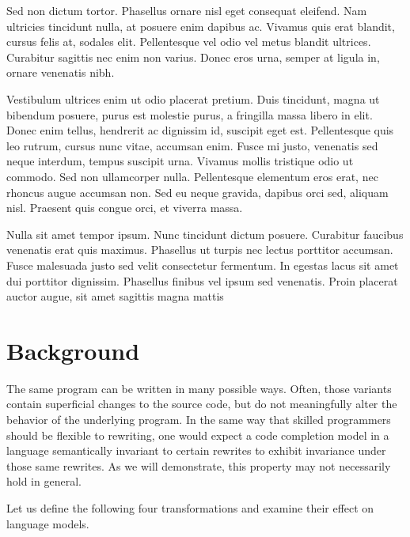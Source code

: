 \documentclass[usenames,dvipsnames]{article} %
\begin{document}
  Sed non dictum tortor. Phasellus ornare nisl eget consequat eleifend. Nam ultricies tincidunt nulla, at posuere enim dapibus ac. Vivamus quis erat blandit, cursus felis at, sodales elit. Pellentesque vel odio vel metus blandit ultrices. Curabitur sagittis nec enim non varius. Donec eros urna, semper at ligula in, ornare venenatis nibh.

  Vestibulum ultrices enim ut odio placerat pretium. Duis tincidunt, magna ut bibendum posuere, purus est molestie purus, a fringilla massa libero in elit. Donec enim tellus, hendrerit ac dignissim id, suscipit eget est. Pellentesque quis leo rutrum, cursus nunc vitae, accumsan enim. Fusce mi justo, venenatis sed neque interdum, tempus suscipit urna. Vivamus mollis tristique odio ut commodo. Sed non ullamcorper nulla. Pellentesque elementum eros erat, nec rhoncus augue accumsan non. Sed eu neque gravida, dapibus orci sed, aliquam nisl. Praesent quis congue orci, et viverra massa.

  Nulla sit amet tempor ipsum. Nunc tincidunt dictum posuere. Curabitur faucibus venenatis erat quis maximus. Phasellus ut turpis nec lectus porttitor accumsan. Fusce malesuada justo sed velit consectetur fermentum. In egestas lacus sit amet dui porttitor dignissim. Phasellus finibus vel ipsum sed venenatis. Proin placerat auctor augue, sit amet sagittis magna mattis

  \pagebreak\section{Background}\label{sec:background}

  The same program can be written in many possible ways. Often, those variants contain superficial changes to the source code, but do not meaningfully alter the behavior of the underlying program. In the same way that skilled programmers should be flexible to rewriting, one would expect a code completion model in a language semantically invariant to certain rewrites to exhibit invariance under those same rewrites. As we will demonstrate, this property may not necessarily hold in general.

  Let us define the following four transformations and examine their effect on language models.
\end{document}
